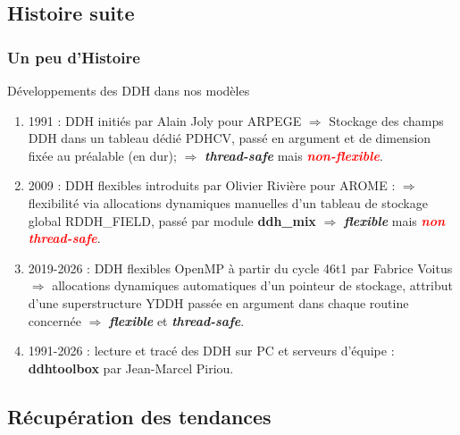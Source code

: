 \documentclass[aspectratio=169]{beamer}
\newcommand{\red}[1]{\textcolor{red}{#1}}
\newcommand{\green}[1]{\textcolor{mydarkgreen}{#1}}
\begin{document}
\subsection{Histoire suite}
\begin{frame}
\frametitle{\normalsize Un peu d'Histoire }
\vspace{-.9cm}
\begin{block}{\normalsize{Développements des DDH dans nos modèles}}
\begin{enumerate}
 \item 1991 : DDH initiés par Alain Joly pour ARPEGE $\Rightarrow$ 
 Stockage des champs DDH dans un tableau dédié PDHCV, 
 passé en argument et de dimension fixée au préalable (en dur);  
 $\Rightarrow$ \textbf{\textit{\green{thread-safe}}} mais \textbf{\textit{\red{non-flexible}}}.\\
 \item 2009 : DDH flexibles introduits par Olivier Rivière pour AROME : 
 $\Rightarrow$ flexibilité via allocations dynamiques manuelles  
 d'un tableau de stockage global RDDH\_FIELD, passé par module \textbf{ddh\_mix} 
 $\Rightarrow$ \textbf{\textit{\green{flexible}}} mais \textbf{\textit{\red{non thread-safe}}}.\\
 \item 2019-2026 : DDH flexibles OpenMP à partir du cycle 46t1 par Fabrice Voitus $\Rightarrow$ allocations dynamiques automatiques 
 d'un pointeur de stockage, attribut d'une superstructure YDDH passée en argument dans chaque routine concernée $\Rightarrow$ \textbf{\textit{\green{flexible}}} et \textbf{\textit{\green{thread-safe}}}.
 \item 1991-2026 : lecture et tracé des DDH sur PC et serveurs d'équipe : \textbf{ddhtoolbox} par Jean-Marcel Piriou.
\end{enumerate}
\end{block}
\logos
\end{frame}
%

\subsection{Récupération des tendances}
\end{document}
